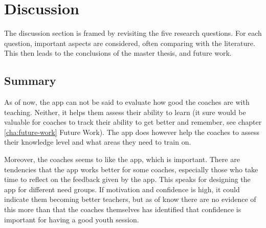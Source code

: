 \chapter{Discussion}\label{cha:discussion}



The discussion section is framed by revisiting the five research questions. For each question, important aspects are considered, often comparing with the literature. This then leads to the conclusions of the master thesis, and future work.











\section{Summary}

As of now, the app can not be said to evaluate how good the coaches are with teaching. Neither, it helps them assess their ability to learn (it sure would be valuable for coaches to track their ability to get better and remember, see chapter \ref{cha:future-work} Future Work). The app does however help the coaches to assess their knowledge level and what areas they need to train on.

Moreover, the coaches seems to like the app, which is important. There are tendencies that the app works better for some coaches, especially those who take time to reflect on the feedback given by the app. This speaks for designing the app for different need groups. If motivation and confidence is high, it could indicate them becoming better teachers, but as of know there are no evidence of this more than that the coaches themselves has identified that confidence is important for having a good youth session.

